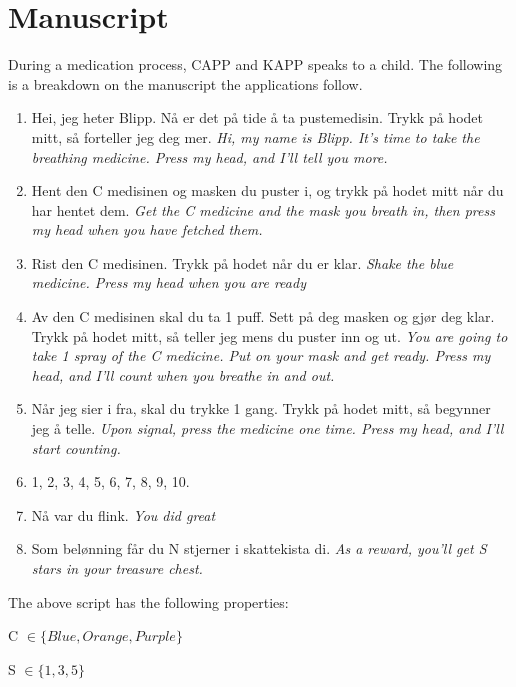\chapter{Manuscript}
\label{chp:manuscript}
During a medication process, CAPP and KAPP speaks to a child. The following is a breakdown on the manuscript the applications follow.
\begin{enumerate}
  \item Hei, jeg heter Blipp. N\r{a} er det p\r{a} tide \r{a} ta pustemedisin. Trykk p\r{a} hodet mitt, s\r{a} forteller jeg deg mer. \emph{Hi, my name is Blipp. It's time to take the breathing medicine. Press my head, and I'll tell you more.}
  \item Hent den C medisinen og masken du puster i, og trykk p\r{a} hodet mitt n\r{a}r du har hentet dem. \emph{Get the C medicine and the mask you breath in, then press my head when you have fetched them.}
  \item Rist den C medisinen. Trykk p\r{a} hodet n\r{a}r du er klar. \emph{Shake the blue medicine. Press my head when you are ready}
  \item Av den C medisinen skal du ta 1 puff. Sett p\r{a} deg masken og gj\o r deg klar. Trykk p\r{a} hodet mitt, s\r{a} teller jeg mens du puster inn og ut. \emph{You are going to take 1 spray of the C medicine. Put on your mask and get ready. Press my head, and I'll count when you breathe in and out.} 
  \item N\r{a}r jeg sier i fra, skal du trykke 1 gang. Trykk p\r{a} hodet mitt, s\r{a} begynner jeg \r{a} telle. \emph{Upon signal, press the medicine one time. Press my head, and I'll start counting. }
  \item 1, 2, 3, 4, 5, 6, 7, 8, 9, 10.
  \item N\r{a} var du flink. \emph{You did great}
  \item Som bel\o nning f\r{a}r du N stjerner i skattekista di. \emph{As a reward, you'll get S stars in your treasure chest.}
\end{enumerate}

The above script has the following properties:

C $\in \{ Blue, Orange, Purple \}$


S $\in \{ 1, 3, 5 \}$ 